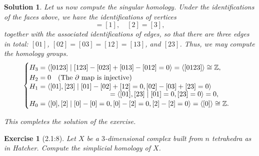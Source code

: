 \documentclass{article}
\theoremstyle{plain}
\newtheorem*{ex}{Exercise}
\theoremstyle{nonumberplain}
\newtheorem{sol}{Solution}
\newcommand{\Z}{\mathbb{Z}}
\DeclarePairedDelimiter{\braket}{\langle}{\rangle}
\begin{document}
\begin{sol}
\smallskip

Let us now compute the singular homology. Under the identifications of the faces above, we have the identifications of vertices
\begin{equation}
[0] = [1], \quad [2] = [3],
\end{equation}
together with the associated identifications of edges, so that there are three edges in total: $[01]$, $[02] = [03] = [12] = [13]$, and $[23]$. Thus, we may compute the homology groups.
\begin{equation}
\begin{cases}
H_3 = \braket{[0123] \mid [123] - [023] + [013] - [012] = 0} = \braket{[0123]} \cong \Z,\\
H_2 = 0 \quad \text{(The $\partial$ map is injective)}\\
\begin{multlined}
H_1 = \braket{[01], [23] \mid [01] - [02] + [12] = 0, [02] - [03] + [23] = 0}\\[-3.5ex]
= \braket{[01], [23] \mid [01] = 0, [23] = 0} = 0,
\end{multlined}\\
H_0 = \braket{[0], [2] \mid [0] - [0] = 0, [0] - [2] = 0, [2] - [2] = 0} = \braket{[0]} \cong \Z.
\end{cases}
\end{equation}

This completes the solution of the exercise.
\end{sol}

\begin{ex}[2.1:8]
Let $X$ be a $3$-dimensional complex built from $n$ tetrahedra as in Hatcher. Compute the simplicial homology of $X$.
\end{ex}
\end{document}
